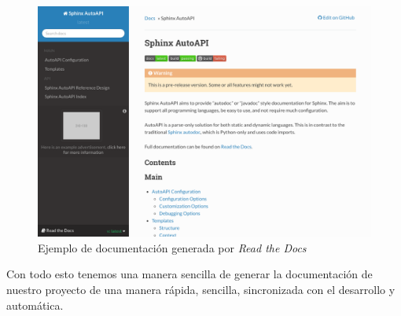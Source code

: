 \begin{figure}[H]
    \centering
    \includegraphics[scale=0.25]{img/example_RTD.png}
    \caption{Ejemplo de documentación generada por \emph{Read the Docs}}
    \label{fig:exampleRTD}
\end{figure}
Con todo esto tenemos una manera sencilla de generar la documentación de nuestro proyecto de una manera rápida, sencilla, sincronizada con el desarrollo y automática.



